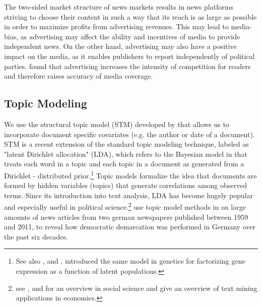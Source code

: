 \documentclass[12pt,a4paper,notitlepage]{article}
\begin{document}
 

The two-sided market structure of news markets results in news platforms striving to choose their content in such a way that its reach is as large as possible in order to maximize profits from advertising revenues. This may lead to media-bias, as advertising may affect the ability and incentives of media to provide independent news. On the other hand, advertising may also have a positive impact on the media, as it enables publishers to report independently of political parties. \citet{ellman_what_2009} found that advertising increases the intensity of competition for readers and therefore raises accuracy of media coverage. 

\subsection{Topic Modeling}

We use the structural topic model (STM) developed by \citet{roberts_model_2016} that allows us to incorporate document specific covariates (e.g. the author or date of a document). STM is a recent extension of the standard topic modeling technique, labeled as "latent Dirichlet allocation" (LDA), which refers to the Bayesian model in \citet{blei_latent_2003} that treats each word in a topic and each topic in a document as generated from a Dirichlet - distributed prior.\footnote{See also \citet{griffiths_probabilistic_2002}, \citet{griffiths_finding_2004} and \citet{hofmann_probabilistic_1999}. \citet{pritchard_inference_2000} introduced the same model in genetics for factorizing gene expression as a function of latent populations.} Topic models formalize the idea that documents are formed by hidden variables (topics) that generate correlations among observed terms. Since its introduction into text analysis, LDA has become hugely popular and especially useful in political science.\footnote{see \citet{blei_probabilistic_2012}, \citet{grimmer_text_2013} and \citet{wiedmann_text_2016} for an overview in social science and \citet{gentzkow_text_2017} give an overview of text mining applications in economics.} \citet{wiedmann_text_2016} use topic model methods in on large amounts of news articles from two german newspapers published between 1959 and 2011, to reveal how democratic demarcation was performed in Germany over the past six decades. 
\end{document}
